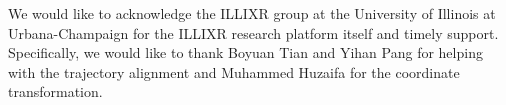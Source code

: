 \documentclass[sigconf,review,screen]{acmart}
\begin{document}
\begin{acks}
We would like to acknowledge the ILLIXR group at the University of Illinois at Urbana-Champaign for the ILLIXR research platform itself and timely support. Specifically, we would like to thank Boyuan Tian and Yihan Pang for helping with the trajectory alignment and Muhammed Huzaifa for the coordinate transformation.
\end{acks}




\end{document}
